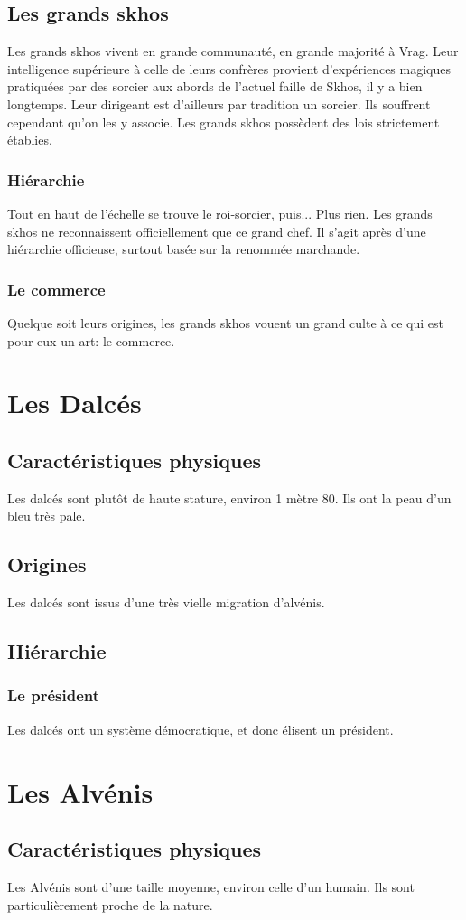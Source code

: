\subsection{Les grands skhos}
Les grands skhos vivent en grande communauté, en grande majorité à Vrag. Leur intelligence supérieure à celle de leurs confrères provient d'expériences magiques pratiquées par des sorcier aux abords de l'actuel faille de Skhos, il y a bien longtemps. Leur dirigeant est d'ailleurs par tradition un sorcier.
Ils souffrent cependant qu’on les y associe. Les grands skhos possèdent des lois strictement établies.
\subsubsection{Hiérarchie}
Tout en haut de l'échelle se trouve le roi-sorcier, puis... Plus rien. Les grands skhos ne reconnaissent officiellement que ce grand chef. Il s'agit après d'une hiérarchie officieuse, surtout basée sur la renommée marchande.
\subsubsection{Le commerce}
Quelque soit leurs origines, les grands skhos vouent un grand culte à ce qui est pour eux un art: le commerce.

\section{Les Dalcés}
\subsection{Caractéristiques physiques}
Les dalcés sont plutôt de haute stature, environ 1 mètre 80. Ils ont la peau d'un bleu très pale.
\subsection{Origines}
Les dalcés sont issus d'une très vielle migration d'alvénis.
\subsection{Hiérarchie}
\subsubsection{Le président}
Les dalcés ont un système démocratique, et donc élisent un président.

\section{Les Alvénis}
\subsection{Caractéristiques physiques}
Les Alvénis sont d'une taille moyenne, environ celle d'un humain. Ils sont particulièrement proche de la nature.